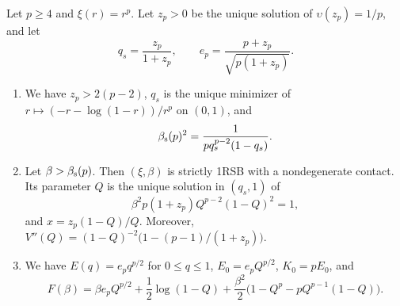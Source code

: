 \begin{proposition}\label{prop:th-pure}
Let $p\ge4$ and $\xi(r)=r^p$. Let $z_p>0$ be the unique solution of $\upsilon(z_p)=1/p$, and let
\[
q_s=\frac{z_p}{1+z_p},\qquad e_p=\frac{p+z_p}{\sqrt{p(1+z_p)}}.
\]
\begin{enumerate}
\item We have $z_p>2(p-2)$, $q_s$ is the unique minimizer of $r\mapsto(-r-\log(1-r))/r^p$ on $(0,1)$, and
\[
\beta_{\mathrm s}(p)^2=\frac1{pq_s^{p-2}(1-q_s)}.
\]
\item Let $\beta>\beta_{\mathrm s}(p)$. Then $(\xi,\beta)$ is strictly 1RSB with a nondegenerate contact. Its parameter $Q$ is the unique solution in $(q_s,1)$ of
\begin{equation}\label{eq:th-pure-root}
\beta^2p(1+z_p)Q^{p-2}(1-Q)^2=1,
\end{equation}
and $x=z_p(1-Q)/Q$. Moreover, $V''(Q)=(1-Q)^{-2}\big(1-(p-1)/(1+z_p)\big)$.
\item We have $E(q)=e_pq^{p/2}$ for $0\le q\le1$, $E_0=e_pQ^{p/2}$, $K_0=pE_0$, and
\[
F(\beta)=\beta e_pQ^{p/2}+\frac12\log(1-Q)+\frac{\beta^2}2\big(1-Q^p-pQ^{p-1}(1-Q)\big).
\]
\end{enumerate}
\end{proposition}

